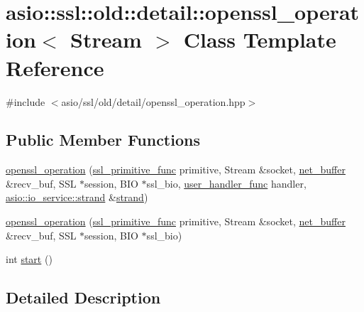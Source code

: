 \hypertarget{classasio_1_1ssl_1_1old_1_1detail_1_1openssl__operation}{}\section{asio\+:\+:ssl\+:\+:old\+:\+:detail\+:\+:openssl\+\_\+operation$<$ Stream $>$ Class Template Reference}
\label{classasio_1_1ssl_1_1old_1_1detail_1_1openssl__operation}


{\ttfamily \#include $<$asio/ssl/old/detail/openssl\+\_\+operation.\+hpp$>$}

\subsection*{Public Member Functions}
\begin{DoxyCompactItemize}
\item 
\hyperlink{classasio_1_1ssl_1_1old_1_1detail_1_1openssl__operation_a54ef0e892487a10547759fde113f63e1}{openssl\+\_\+operation} (\hyperlink{namespaceasio_1_1ssl_1_1old_1_1detail_ac338e0197f7b92011daad86db7d838ba}{ssl\+\_\+primitive\+\_\+func} primitive, Stream \&socket, \hyperlink{classasio_1_1ssl_1_1old_1_1detail_1_1net__buffer}{net\+\_\+buffer} \&recv\+\_\+buf, S\+S\+L $\ast$session, B\+I\+O $\ast$ssl\+\_\+bio, \hyperlink{namespaceasio_1_1ssl_1_1old_1_1detail_adb21335c4883c670ec54bece575120eb}{user\+\_\+handler\+\_\+func} handler, \hyperlink{classasio_1_1io__service_1_1strand}{asio\+::io\+\_\+service\+::strand} \&\hyperlink{namespaceasio_a3be3fa00c86ab58ba41aabe8fcbf11be}{strand})
\item 
\hyperlink{classasio_1_1ssl_1_1old_1_1detail_1_1openssl__operation_aecb9155902fa79c692c3e7b0fe4c28c7}{openssl\+\_\+operation} (\hyperlink{namespaceasio_1_1ssl_1_1old_1_1detail_ac338e0197f7b92011daad86db7d838ba}{ssl\+\_\+primitive\+\_\+func} primitive, Stream \&socket, \hyperlink{classasio_1_1ssl_1_1old_1_1detail_1_1net__buffer}{net\+\_\+buffer} \&recv\+\_\+buf, S\+S\+L $\ast$session, B\+I\+O $\ast$ssl\+\_\+bio)
\item 
int \hyperlink{classasio_1_1ssl_1_1old_1_1detail_1_1openssl__operation_a0ce775c786d8f766f9af9e10a5507129}{start} ()
\end{DoxyCompactItemize}


\subsection{Detailed Description}
